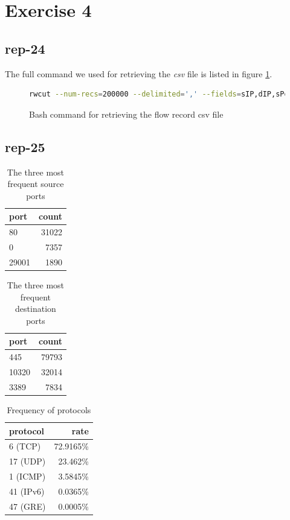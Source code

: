 \section*{Exercise 4}
\subsection*{rep-24}
The full command we used for retrieving the \textit{csv} file is listed in figure \ref{fig:bash-flowrec}.
\begin{figure}[H]
\begin{lstlisting}[language=bash]
rwcut --num-recs=200000 --delimited=',' --fields=sIP,dIP,sPort,dPort,protocol,flags,ttl,bytes team16.flowrecord.rw > team16_flowrecord.csv
\end{lstlisting}
\caption{ Bash command for retrieving the flow record csv file }
\label{fig:bash-flowrec}
\end{figure}
\subsection*{rep-25}
\begin{table}[H]
\center
\begin{tabular}{lr}
\toprule
port & count \\
\midrule
80 & 31022 \\
0 & 7357 \\
29001 & 1890 \\ 
\bottomrule
\end{tabular}
\caption{ The three most frequent source ports }
\label{tab:most-frequent-source-ports}
\end{table}

\begin{table}[H]
\center
\begin{tabular}{lr}
\toprule
port & count \\
\midrule
445 & 79793 \\
10320 & 32014 \\
3389 & 7834 \\
\bottomrule
\end{tabular}
\caption{ The three most frequent destination ports }
\label{tab:most-frequent-destination-ports}
\end{table}

\begin{table}[H]
\center
\begin{tabular}{lr}
\toprule
protocol & rate \\
\midrule
6 (TCP) & 72.9165\% \\
17 (UDP) & 23.462\% \\
1 (ICMP) & 3.5845\% \\
41 (IPv6) & 0.0365\% \\
47 (GRE) & 0.0005\% \\
\bottomrule
\end{tabular}
\caption{ Frequency of protocols }
\label{tab:all-protocols}
\end{table}


